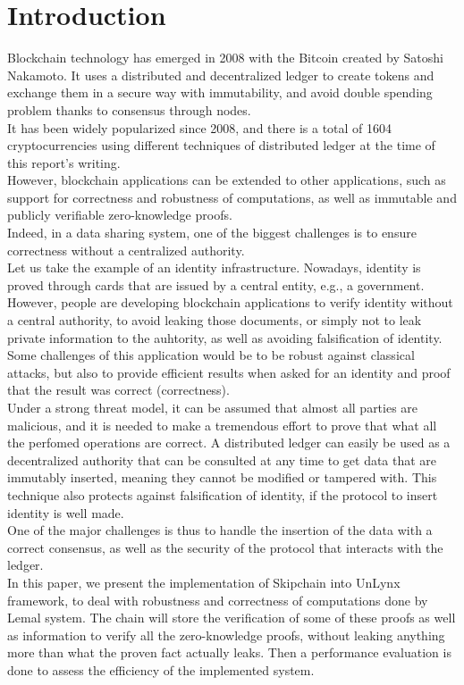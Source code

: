 \documentclass{article}
\begin{document}
\newpage

\tableofcontents

\newpage

\section{Introduction}
Blockchain \cite{bitcoin} technology has emerged in 2008 with the Bitcoin created by Satoshi Nakamoto. It uses a distributed and decentralized ledger to create tokens and exchange them in a secure way with immutability, and avoid double spending problem \cite{spending} thanks to consensus through nodes.\\
It has been widely popularized since 2008, and there is a total of 1604 cryptocurrencies \cite{coinmarket} using different techniques of distributed ledger at the time of this report's writing.\\
However, blockchain applications can be extended to other applications, such as support for correctness and robustness of computations, as well as immutable and publicly verifiable zero-knowledge proofs.\\
Indeed, in a data sharing system, one of the biggest challenges is to ensure correctness without a centralized authority.\\
Let us take the example of an identity infrastructure. Nowadays, identity is proved through cards that are issued by a central entity, e.g., a government. However, people are developing blockchain applications to verify identity without a central authority, to avoid leaking those documents, or simply not to leak private information to the auhtority, as well as avoiding falsification of identity.\\ 
Some challenges of this application would be to be robust against classical attacks, but also to provide efficient results when asked for an identity and proof that the result was correct (correctness).\\
Under a strong threat model, it can be assumed that almost all parties are malicious, and it is needed to make a tremendous effort to prove that what all the perfomed operations are correct. A distributed ledger can easily be used as a decentralized authority that can be consulted at any time to get data that are immutably inserted, meaning they cannot be modified or tampered with. This technique also protects against falsification of identity, if the protocol to insert identity is well made.\\
One of the major challenges is thus to handle the insertion of the data with a correct consensus, as well as the security of the protocol that interacts with the ledger.\\
In this paper, we present the implementation of Skipchain \cite{chainiac,skipchain} into UnLynx framework, to deal with robustness and correctness of computations done by Lemal system. The chain will store the verification of some of these proofs as well as information to verify all the zero-knowledge proofs, without leaking anything more than what the proven fact actually leaks. Then a performance evaluation is done to assess the efficiency of the implemented system.
\end{document}
